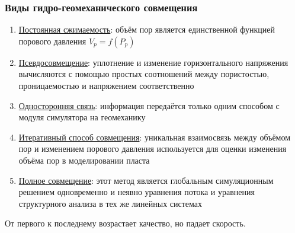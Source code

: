 \documentclass[main.tex]{subfiles}
\begin{document}
\subsubsection{Виды гидро-геомеханического совмещения}

\begin{enumerate}
\item \underline{Постоянная сжимаемость}: объём пор является единственной функцией порового давления $V_p=f(P_p)$
\item \underline{Псевдосовмещение}: уплотнение и изменение горизонтального напряжения вычисляются с помощью простых соотношений между пористостью, проницаемостью и напряжением соответственно
\item \underline{Односторонняя связь}: информация передаётся только одним способом с модуля симулятора на геомеханику
\item \underline{Итеративный способ совмещения}: уникальная взаимосвязь между объёмом пор и изменением порового давления используется для оценки изменения объёма пор в моделировании пласта
\item \underline{Полное совмещение}: этот метод является глобальным симуляционным решением одновременно и неявно уравнения потока и уравнения структурного анализа в тех же линейных системах
\end{enumerate}

От первого к последнему возрастает качество, но падает скорость.


\end{document}

